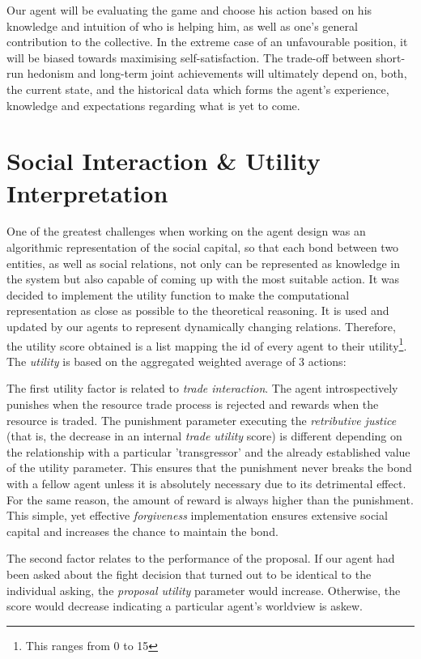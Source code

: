         Our agent will be evaluating the game and choose his action based on his knowledge and intuition of who is helping him, as well as one's general contribution to the collective. In the extreme case of an unfavourable position, it will be biased towards maximising self-satisfaction. The trade-off between short-run hedonism and long-term joint achievements will ultimately depend on, both, the current state, and the historical data which forms the agent's experience, knowledge and expectations regarding what is yet to come. 

\section{Social Interaction \& Utility Interpretation}

        One of the greatest challenges when working on the agent design was an algorithmic representation of the social capital, so that each bond between two entities, as well as social relations, not only can be represented as knowledge in the system but also capable of coming up with the most suitable action. It was decided to implement the utility function to make the computational representation as close as possible to the theoretical reasoning. It is used and updated by our agents to represent dynamically changing relations. Therefore, the utility score obtained is a list mapping the id of every agent to their utility\footnote{This ranges from 0 to 15}. The \textit{utility} is based on the aggregated weighted average of 3 actions:
        
        The first utility factor is related to \textit{trade interaction}. The agent introspectively punishes when the resource trade process is rejected and rewards when the resource is traded.
        The punishment parameter executing the \textit{retributive justice} (that is, the decrease in an internal \textit{trade utility} score) is different depending on the relationship with a particular 'transgressor' and the already established value of the utility parameter. This ensures that the punishment never breaks the bond with a fellow agent unless it is absolutely necessary due to its detrimental effect. For the same reason, the amount of reward is always higher than the punishment. This simple, yet effective \textit{forgiveness} implementation ensures extensive social capital and increases the chance to maintain the bond.
        
        The second factor relates to the performance of the proposal. If our agent had been asked about the fight decision that turned out to be identical to the individual asking, the \textit{proposal utility} parameter would increase. Otherwise, the score would decrease indicating a particular agent's worldview is askew. 
        
